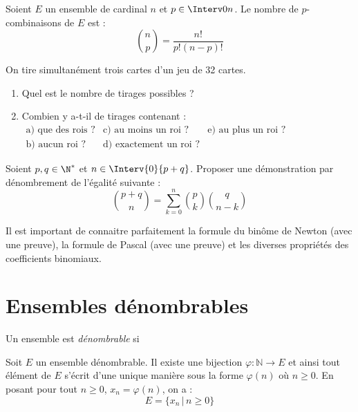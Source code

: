 \documentclass[a4paper,10pt]{report}
\begin{document}
\begin{prop} Soient $E$ un ensemble de cardinal $n$ et $p \in \Interv 0n$. Le nombre de $p$-combinaisons de $E$ est :
$$\binom{n}{p}  = \frac{n!}{p!(n-p)!}$$
\end{prop}

\begin{ex} On tire simultanément trois cartes d'un jeu de 32 cartes.
\begin{enumerate}
\item Quel est le nombre de tirages possibles ?

\vspace{2cm}
\newpage
\item Combien y a-t-il de tirages contenant :\\
$\begin{array}{lll}
\text{a) que des rois ?} & \text{c) au moins un roi ?} & \text{e) au plus un roi ?}\\
\text{b) aucun roi ?} & \text{d) exactement un roi ?} &
\end{array}$
\end{enumerate}

\vspace{7cm}
\end{ex}

\begin{exa} Soient $p,q \in \N^*$ et $n \in \Interv{0}{p+q}$. Proposer une démonstration par dénombrement de l'égalité suivante :
  \[
  \binom{p + q}{n} = \sum_{k = 0}^{n} \binom{p}{k}\binom{q}{n - k}
  \]
\end{exa}

\begin{rem} Il est important de connaitre parfaitement la formule du binôme de Newton (avec une preuve), la formule de Pascal (avec une preuve) et les diverses propriétés des coefficients binomiaux.
\end{rem}

\section{Ensembles dénombrables}


\begin{defin} Un ensemble est \textit{dénombrable} si 
\end{defin}

\begin{rem} Soit $E$ un ensemble dénombrable. Il existe une bijection $\varphi : \mathbb{N} \rightarrow E$ et ainsi tout élément de $E$ s'écrit d'une unique manière sous la forme $\varphi(n)$ où $n \geq 0$. En posant pour tout $n \geq 0$, $x_n= \varphi(n)$, on a :
$$ E = \lbrace x_n \, \vert \, n \geq 0 \rbrace$$
\end{rem}
\end{document}
